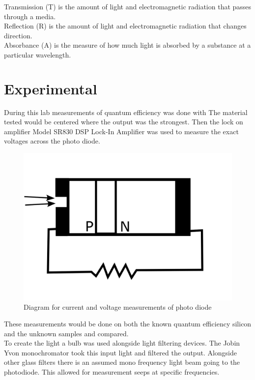 \documentclass[10pt,a4paper]{article}
\begin{document}
\begin{multicols}{2}
Transmission (T) is the amount of light and electromagnetic radiation that passes through a media.\\
Reflection (R) is the amount of light and electromagnetic radiation that changes direction. \\
Absorbance (A) is the measure of how much light is absorbed by a substance at a particular wavelength.\\



\section*{Experimental}
During this lab measurements of quantum efficiency was done with 
The material tested would be centered where the output was the strongest. Then the lock on amplifier Model SR830 DSP Lock-In Amplifier was used to measure the exact voltages across the photo diode.


\begin{figure}[H]\centering\label{meascurrent}

\includegraphics[scale=0.25]{measuringcurrent}
\caption{Diagram for current and voltage measurements of photo diode}
\end{figure}
These measurements would be done on both the known quantum efficiency silicon and the unknown samples and compared.\\
To create the light a bulb was used alongside light filtering devices. The Jobin Yvon monochromator took this input light and filtered the output. Alongside other glass filters there is an assumed mono frequency light beam going to the photodiode. This allowed for measurement seeps at specific frequencies.




\end{multicols}
\end{document}
